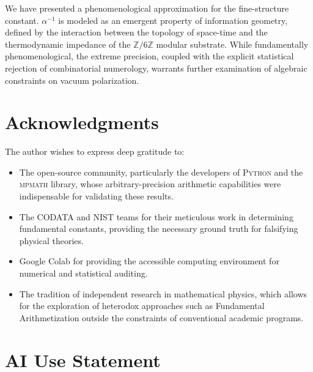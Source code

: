 \documentclass[12pt,a4paper]{article}
\begin{document}
We have presented a phenomenological approximation for the fine-structure constant. $\alpha^{-1}$ is modeled as an emergent property of information geometry, defined by the interaction between the topology of space-time and the thermodynamic impedance of the $\mathbb{Z}/6\mathbb{Z}$ modular substrate. While fundamentally phenomenological, the extreme precision, coupled with the explicit statistical rejection of combinatorial numerology, warrants further examination of algebraic constraints on vacuum polarization.


\section*{Acknowledgments}

The author wishes to express deep gratitude to:
\begin{itemize}
    \item The open-source community, particularly the developers of \textsc{Python} and the \textsc{mpmath} library, whose arbitrary-precision arithmetic capabilities were indispensable for validating these results.
    \item The CODATA and NIST teams for their meticulous work in determining fundamental constants, providing the necessary ground truth for falsifying physical theories.
    \item Google Colab for providing the accessible computing environment for numerical and statistical auditing.
    \item The tradition of independent research in mathematical physics, which allows for the exploration of heterodox approaches such as Fundamental Arithmetization outside the constraints of conventional academic programs.
\end{itemize}

\section*{AI Use Statement}
\end{document}
